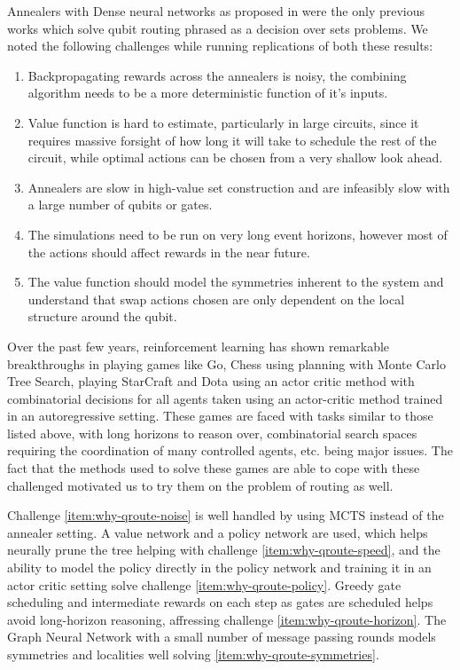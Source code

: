 Annealers with Dense neural networks as proposed in \cite{qroute_dqn1,qroute_dqn2} were the only previous works which solve qubit routing phrased as a decision over sets problems. We noted the following challenges while running replications of both these results:
\begin{enumerate}
    \item\label{item:why-qroute-noise} Backpropagating rewards across the annealers is noisy, the combining algorithm needs to be a more deterministic function of it's inputs.
    \item\label{item:why-qroute-policy} Value function is hard to estimate, particularly in large circuits, since it requires massive forsight of how long it will take to schedule the rest of the circuit, while optimal actions can be chosen from a very shallow look ahead.
    \item\label{item:why-qroute-speed} Annealers are slow in high-value set construction and are infeasibly slow with a large number of qubits or gates.
    \item\label{item:why-qroute-horizon} The simulations need to be run on very long event horizons, however most of the actions should affect rewards in the near future. 
    \item\label{item:why-qroute-symmetries} The value function should model the symmetries inherent to the system and understand that swap actions chosen are only dependent on the local structure around the qubit.
\end{enumerate}

Over the past few years, reinforcement learning has shown remarkable breakthroughs in playing games like Go\cite{mcts-alphago}, Chess\cite{mcts-alphazero} using planning with Monte Carlo Tree Search, playing StarCraft\cite{rl-alphastar-blog} and Dota\cite{rl-openai-dota} using an actor critic method with combinatorial decisions for all agents taken using an actor-critic method trained in an autoregressive setting. These games are faced with tasks similar to those listed above, with long horizons to reason over, combinatorial search spaces requiring the coordination of many controlled agents, etc. being major issues. The fact that the methods used to solve these games are able to cope with these challenged motivated us to try them on the problem of routing as well.

Challenge \ref{item:why-qroute-noise} is well handled by using MCTS instead of the annealer setting. A value network and a policy network are used, which helps neurally prune the tree helping with challenge \ref{item:why-qroute-speed}, and the ability to model the policy directly in the policy network and training it in an actor critic setting solve challenge \ref{item:why-qroute-policy}. Greedy gate scheduling and intermediate rewards on each step as gates are scheduled helps avoid long-horizon reasoning, affressing challenge \ref{item:why-qroute-horizon}. The Graph Neural Network with a small number of message passing rounds models symmetries and localities well solving \ref{item:why-qroute-symmetries}.

